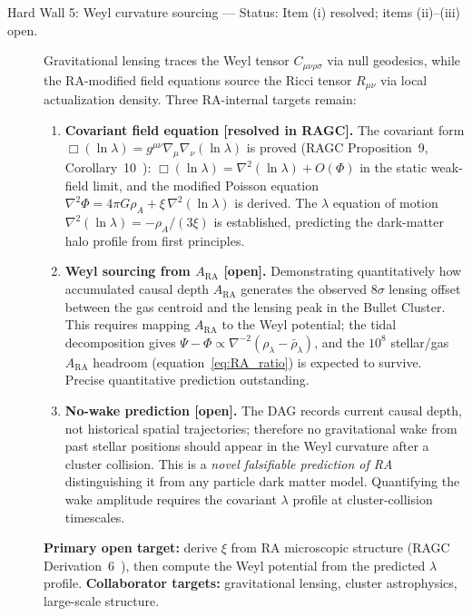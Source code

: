 \documentclass[11pt,a4paper]{article}
\theoremstyle{plain}
\theoremstyle{definition}
\theoremstyle{remark}
\newcommand{\ARA}{A_{\mathrm{RA}}}
\begin{document}
\begin{description}
  \item[Hard Wall 5: Weyl curvature sourcing --- Status: Item (i) resolved; items (ii)--(iii) open.] Gravitational lensing traces the Weyl tensor
  $C_{\mu\nu\rho\sigma}$ via null geodesics, while the RA-modified field
  equations source the Ricci tensor $R_{\mu\nu}$ via local actualization
  density. Three RA-internal targets remain:
  \begin{enumerate}[noitemsep]
  \item \textbf{Covariant field equation [resolved in RAGC].}
  The covariant form $\Box(\ln\lambda) = g^{\mu\nu}\nabla_\mu\nabla_\nu(\ln\lambda)$
  is proved (RAGC Proposition~9, Corollary~10~\citep{Sandeman2026b}):
  $\Box(\ln\lambda) = \nabla^2(\ln\lambda) + O(\Phi)$ in the static
  weak-field limit, and the modified Poisson equation
  $\nabla^2\Phi = 4\pi G\rho_A + \xi\,\nabla^2(\ln\lambda)$ is derived.
  The $\lambda$ equation of motion $\nabla^2(\ln\lambda) = -\rho_A/(3\xi)$
  is established, predicting the dark-matter halo profile from first principles.
  \item \textbf{Weyl sourcing from $A_{\mathrm{RA}}$ [open].}
  Demonstrating quantitatively how accumulated causal depth $\ARA$
  generates the observed $8\sigma$ lensing offset between the
  gas centroid and the lensing peak in the Bullet Cluster.
  This requires mapping $\ARA$ to the Weyl potential; the tidal
  decomposition gives $\Psi - \Phi \propto \nabla^{-2}(\rho_\lambda - \bar\rho_\lambda)$,
  and the $10^8$ stellar/gas $\ARA$ headroom (equation~\eqref{eq:RA_ratio})
  is expected to survive. Precise quantitative prediction outstanding.
  \item \textbf{No-wake prediction [open].}
  The DAG records current causal depth, not historical spatial trajectories;
  therefore no gravitational wake from past stellar positions should appear
  in the Weyl curvature after a cluster collision. This is a
  \emph{novel falsifiable prediction of RA} distinguishing it from
  any particle dark matter model. Quantifying the wake amplitude
  requires the covariant $\lambda$ profile at cluster-collision timescales.
  \end{enumerate}
  \textbf{Primary open target:} derive $\xi$ from RA microscopic structure
  (RAGC Derivation~6~\citep{Sandeman2026b}), then compute the Weyl potential
  from the predicted $\lambda$ profile.
  \textbf{Collaborator targets:} gravitational lensing, cluster astrophysics,
  large-scale structure.
\end{description}
\end{document}
